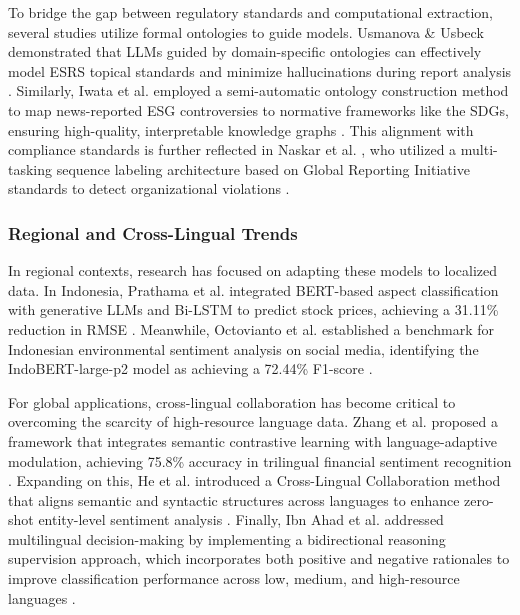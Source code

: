 \documentclass{article}
\begin{document}
To bridge the gap between regulatory standards and computational extraction, several studies utilize formal ontologies to guide models. Usmanova \& Usbeck  \parencite{aida_usmanova_e9b44e1d} demonstrated that LLMs guided by domain-specific ontologies can effectively model ESRS topical standards and minimize hallucinations during report analysis  \parencite{aida_usmanova_e9b44e1d}. Similarly, Iwata et al.  \parencite{tsuyoshi_iwata_18ccc0b8} employed a semi-automatic ontology construction method to map news-reported ESG controversies to normative frameworks like the SDGs, ensuring high-quality, interpretable knowledge graphs  \parencite{tsuyoshi_iwata_18ccc0b8}. This alignment with compliance standards is further reflected in Naskar et al.  \parencite{abir_naskar_17efeb7b}, who utilized a multi-tasking sequence labeling architecture based on Global Reporting Initiative standards to detect organizational violations  \parencite{abir_naskar_17efeb7b}.
\subsubsection{Regional and Cross-Lingual Trends}

In regional contexts, research has focused on adapting these models to localized data. In Indonesia, Prathama et al.  \parencite{ubaidillah_ariq_prathama_a1856e2f} integrated BERT-based aspect classification with generative LLMs and Bi-LSTM to predict stock prices, achieving a 31.11\% reduction in RMSE  \parencite{ubaidillah_ariq_prathama_a1856e2f}. Meanwhile, Octovianto et al.  \parencite{christofer_octovianto_487e90aa} established a benchmark for Indonesian environmental sentiment analysis on social media, identifying the IndoBERT-large-p2 model as achieving a 72.44\% F1-score  \parencite{christofer_octovianto_487e90aa}.

For global applications, cross-lingual collaboration has become critical to overcoming the scarcity of high-resource language data. Zhang et al.  \parencite{liman_zhang_ec332205} proposed a framework that integrates semantic contrastive learning with language-adaptive modulation, achieving 75.8\% accuracy in trilingual financial sentiment recognition  \parencite{liman_zhang_ec332205}. Expanding on this, He et al.  \parencite{association_for_computational_linguistics_2025_5a25f994} introduced a Cross-Lingual Collaboration method that aligns semantic and syntactic structures across languages to enhance zero-shot entity-level sentiment analysis  \parencite{association_for_computational_linguistics_2025_5a25f994}. Finally, Ibn Ahad et al.  \parencite{association_for_computational_linguistics_2025_1ba46dee} addressed multilingual decision-making by implementing a bidirectional reasoning supervision approach, which incorporates both positive and negative rationales to improve classification performance across low, medium, and high-resource languages  \parencite{association_for_computational_linguistics_2025_1ba46dee}.
\end{document}
